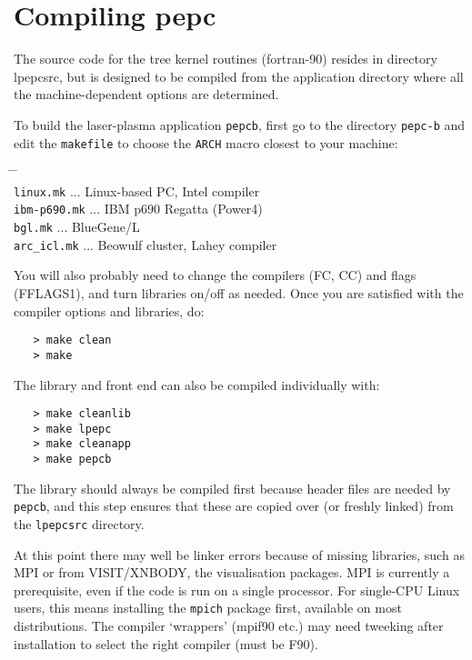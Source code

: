 \documentclass[11pt,psfig]{article}
\begin{document}
\section{Compiling {\sc pepc}} 

The source code for the tree kernel routines (fortran-90) resides in directory
lpepcsrc, but is designed to be compiled from the application directory where
all the machine-dependent options are determined.

\medskip\noindent
To build the laser-plasma application {\tt pepcb}, first go to the directory
{\tt pepc-b} and edit the {\tt makefile} to choose the {\tt ARCH} macro closest to your machine:

\begin{tabbing}
\hspace{1cm} \= \hspace{3cm} \= \hspace{1cm} \=\\
\> \texttt{linux.mk} \> ... \> Linux-based PC, Intel compiler\\
\> \texttt{ibm-p690.mk} \> ... \> IBM p690 Regatta (Power4)\\
\> \texttt{bgl.mk} \> ... \> BlueGene/L \\
\> \texttt{arc_icl.mk} \> ... \> Beowulf cluster, Lahey compiler 
\end{tabbing}

\noindent
You will also probably need to change the compilers (FC, CC) and flags
(FFLAGS1), and turn libraries on/off as needed.
Once you are satisfied with the compiler options and libraries, do:

\begin{verbatim}
   > make clean
   > make
\end{verbatim}

\noindent
The library and front end can also be compiled individually with:
\begin{verbatim}
   > make cleanlib 
   > make lpepc
   > make cleanapp
   > make pepcb
\end{verbatim}
 
\noindent
The library should always be compiled first because header files are needed by
{\tt pepcb}, and this step ensures that these are copied over (or freshly
linked) from the {\tt lpepcsrc} directory.

\medskip\noindent
At this point there may well be linker errors because of missing
libraries, such as MPI or from VISIT/XNBODY, the visualisation packages.  MPI is
currently a prerequisite, even if the code is run on a single processor.  For
single-CPU Linux users, this means installing the {\tt mpich} package first, available on
most distributions.  The compiler `wrappers' (mpif90 etc.) may need tweeking
after installation to select the right compiler (must be F90).
\end{document}
